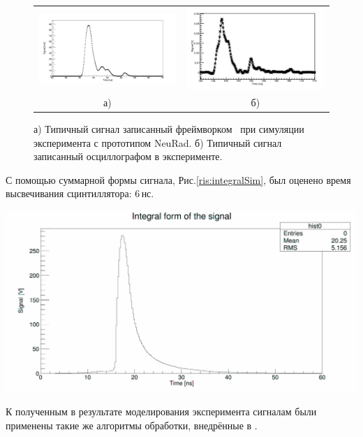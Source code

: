 \begin{figure}[!ht]
	\centering
	\begin{tabular}{cc}
		\includegraphics[width=0.52\linewidth]{simSignal1.png} 
		&
		\includegraphics[width=0.48\linewidth]{originalsignalform.png} \\
		а) & б)
	\end{tabular}
	\caption[Short caption for list of figures]{а) Типичный сигнал записанный фреймворком \er\ при симуляции эксперимента с прототипом  NeuRad. б) Типичный сигнал записанный осциллографом в эксперименте.}
	\label{ris:compare}
\end{figure}

С помощью суммарной формы сигнала, Рис.\ref{ris:integralSim}, был оценено время высвечивания сцинтиллятора: 6\,нс. 

{
	\centering
	\includegraphics[width=\linewidth]{integralSim.png}
	\label{ris:integralSim}
}

К полученным в результате моделирования эксперимента сигналам были применены такие же алгоритмы обработки, внедрённые в \er. 

